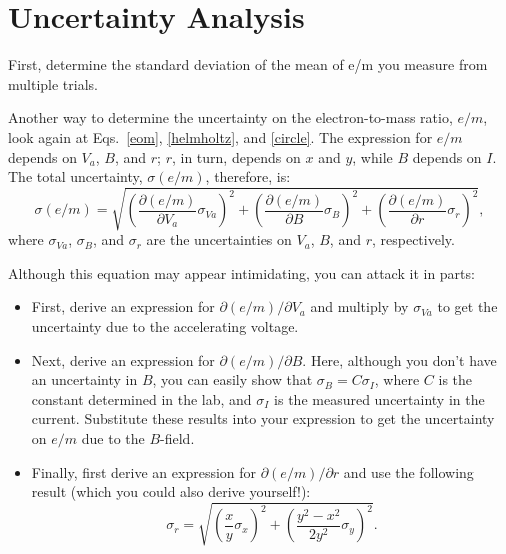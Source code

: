 \documentclass{tufte-handout}
\begin{document}
\section{Uncertainty Analysis}

First, determine the standard deviation of the mean of e/m
you measure from multiple trials.

Another way to determine the uncertainty on the electron-to-mass ratio, $e/m$, look again at
Eqs.~\ref{eom}, \ref{helmholtz}, and \ref{circle}. The expression for $e/m$
depends on $V_a$, $B$, and $r$; $r$, in turn, depends on $x$ and $y$, while $B$
depends on $I$.
The total uncertainty, $\sigma(e/m)$, therefore, is:
\begin{equation}
\sigma(e/m) = \sqrt{ 
  \left(\frac{\partial(e/m)}{\partial V_a} \sigma_{Va}\right)^2 + 
  \left(\frac{\partial(e/m)}{\partial B} \sigma_B\right)^2 + 
  \left(\frac{\partial(e/m)}{\partial r} \sigma_r\right)^2 },
\label{eq:sigma_eom}
\end{equation}
\noindent where $\sigma_{Va}$, $\sigma_B$, and $\sigma_r$ are the uncertainties
on $V_a$, $B$, and $r$, respectively. 

Although this equation may appear intimidating, you can attack it in parts:
\begin{itemize}
  \item First, derive an expression for $\partial(e/m)/\partial V_a$ and
    multiply by $\sigma_{Va}$ to get the uncertainty due to the accelerating
    voltage.
  \item Next, derive an expression for $\partial(e/m)/\partial B$. Here,
    although you don't have an uncertainty in $B$, you can easily show that
    $\sigma_B = C\sigma_I$, where $C$ is the constant determined in the lab, and
    $\sigma_I$ is the measured uncertainty in the current. Substitute these
    results into your expression to get the uncertainty on $e/m$ due to the
    $B$-field.
  \item Finally, first derive an expression for $\partial(e/m)/\partial r$ and
    use the following result (which you could also derive yourself!):
    \begin{equation}
      \sigma_r = \sqrt{ \left(\frac{x}{y}\sigma_x\right)^2 +
        \left(\frac{y^2-x^2}{2y^2} \sigma_y\right)^2 }.
    \end{equation}
\end{itemize}
\end{document}
